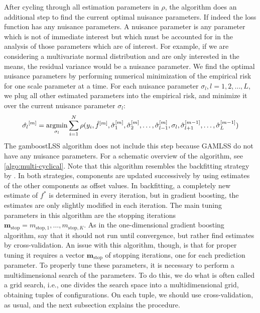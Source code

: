 After cycling through all estimation parameters in $\rho$, the algorithm does an additional step to find the current optimal nuisance parameters. If indeed the loss function has any nuisance parameters. A nuisance parameter is any parameter which is not of immediate interest but which must be accounted for in the analysis of those parameters which are of interest. For example, if we are considering a multivariate normal distribution and are only interested in the means, the residual variance would be a nuisance parameter. We find the optimal nuisance parameters by performing numerical minimization of the empirical risk for one scale parameter at a time.
For each nuisance parameter $\sigma_l, l=1,2,\ldots,L$, we plug all other estimated parameters into the empirical risk, and minimize it over the current nuisance parameter $\sigma_l$:
\begin{equation}
    \hat{\sigma_l}^{[m]}=\operatorname*{argmin}_{\sigma_l} \sum_{i=1}^N \rho(y_i,\hat{f}^{[m]},\hat{\sigma}_1^{[m]},\hat{\sigma}_2^{[m]},\ldots,
    \hat{\sigma}_{l-1}^{[m]},\sigma_l,\hat{\sigma}_{l+1}^{[m-1]},\ldots,\hat{\sigma}_L^{[m-1]})
\end{equation}
The gamboostLSS algorithm \citep{gamboostlss-paper} does not include this step because GAMLSS do not have any nuisance parameters.
For a schematic overview of the algorithm, see \eqref{algo:multi-cyclical}. Note that this algorithm resembles the backfitting strategy by \citet{hastie1986}.
In both strategies, components are updated successively by using estimates of the other components as offset values. In backfitting, a completely new estimate of $f^*$ is determined in every iteration, but in gradient boosting, the estimates are only slightly modified in each iteration.
The main tuning parameters in this algorithm are the stopping iterations $\mathbf{m}_{\text{stop}}=m_{\text{stop},1},\ldots,m_{\text{stop},K}$. As in the one-dimensional gradient boosting algorithm, \citet{schmid} say that it should not run until convergence, but rather find estimates by cross-validation. An issue with this algorithm, though, is that for proper tuning it requires a vector $\mathbf{m}_{\text{stop}}$ of stopping iterations, one for each prediction parameter. To properly tune these parameters, it is necessary to perform a multidimensional search of the parameters. To do this, we do what is often called a grid search, i.e., one divides the search space into a multidimensional grid, obtaining tuples of configurations. On each tuple, we should use cross-validation, as usual, and the next subsection explains the procedure.
